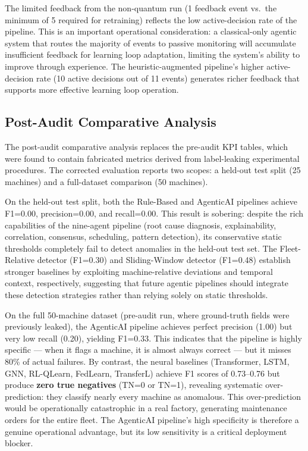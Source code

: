 The limited feedback from the non-quantum run (1 feedback event vs.\ the minimum of 5 required for retraining) reflects the low active-decision rate of the pipeline. This is an important operational consideration: a classical-only agentic system that routes the majority of events to passive monitoring will accumulate insufficient feedback for learning loop adaptation, limiting the system's ability to improve through experience. The heuristic-augmented pipeline's higher active-decision rate (10 active decisions out of 11 events) generates richer feedback that supports more effective learning loop operation.

\subsection{Post-Audit Comparative Analysis}

The post-audit comparative analysis replaces the pre-audit KPI tables, which were found to contain fabricated metrics derived from label-leaking experimental procedures. The corrected evaluation reports two scopes: a held-out test split (25 machines) and a full-dataset comparison (50 machines).

On the held-out test split, both the Rule-Based and AgenticAI pipelines achieve F1=0.00, precision=0.00, and recall=0.00. This result is sobering: despite the rich capabilities of the nine-agent pipeline (root cause diagnosis, explainability, correlation, consensus, scheduling, pattern detection), its conservative static thresholds completely fail to detect anomalies in the held-out test set. The Fleet-Relative detector (F1=0.30) and Sliding-Window detector (F1=0.48) establish stronger baselines by exploiting machine-relative deviations and temporal context, respectively, suggesting that future agentic pipelines should integrate these detection strategies rather than relying solely on static thresholds.

On the full 50-machine dataset (pre-audit run, where ground-truth fields were previously leaked), the AgenticAI pipeline achieves perfect precision (1.00) but very low recall (0.20), yielding F1=0.33. This indicates that the pipeline is highly specific --- when it flags a machine, it is almost always correct --- but it misses 80\% of actual failures. By contrast, the neural baselines (Transformer, LSTM, GNN, RL-QLearn, FedLearn, TransferL) achieve F1 scores of 0.73--0.76 but produce \textbf{zero true negatives} (TN=0 or TN=1), revealing systematic over-prediction: they classify nearly every machine as anomalous. This over-prediction would be operationally catastrophic in a real factory, generating maintenance orders for the entire fleet. The AgenticAI pipeline's high specificity is therefore a genuine operational advantage, but its low sensitivity is a critical deployment blocker.

